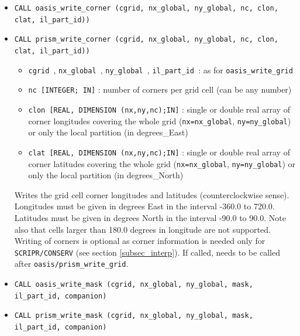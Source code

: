 \begin{itemize}
  Writes the component grid longitudes and latitudes. Longitudes must be
  given in degrees East in the interval -360.0 to 720.0. Latitudes
  must be given in degrees North in the interval -90.0 to 90.0. Note
  that if some grid points overlap, it is recommended to define those
  points with the same number (e.g. 90.0 for both, not 450.0 for one
  and 90.0 for the other) to ensure automatic detection of overlap by
  OASIS3-MCT (which is essential to have a correct conservative
  remapping \texttt{SCRIPR/CONSERV}, see section \ref{subsec_interp}).

  \vspace{0.2cm}
\item {\tt CALL oasis\_write\_corner (cgrid, nx\_global, ny\_global, nc, clon, clat, il\_part\_id))}
\item {\tt CALL prism\_write\_corner (cgrid, nx\_global, ny\_global, nc, clon, clat, il\_part\_id))}

  \begin{itemize}
  \item {\tt cgrid }, {\tt nx\_global }, {\tt ny\_global }, {\tt il\_part\_id }: as for {\tt oasis\_write\_grid}

  \item {\tt nc [INTEGER; IN]} : number of corners per grid cell (can be any number)
  \item {\tt clon [REAL, DIMENSION (nx,ny,nc);IN]} : single or double real array of corner
    longitudes covering the whole grid ({\tt nx=nx\_global}, {\tt ny=ny\_global}) or only the local partition (in degrees\_East)
  \item {\tt clat [REAL, DIMENSION (nx,ny,nc);IN]} : single or double real array of corner
    latitudes covering the whole grid ({\tt nx=nx\_global}, {\tt ny=ny\_global}) or only the local partition (in degrees\_North)
  \end{itemize}

  Writes the grid cell corner longitudes and latitudes
  (counterclockwise sense). Longitudes must be given in degrees East
  in the interval -360.0 to 720.0. Latitudes must be given in degrees
  North in the interval -90.0 to 90.0. Note also that cells larger
  than 180.0 degrees in longitude are not supported. Writing of
  corners is optional as corner information is needed only for {\tt
    SCRIPR/CONSERV} (see section \ref{subsec_interp}). If called,
  needs to be called after {\tt oasis/prism\_write\_grid}.

  \vspace{0.2cm}
\item {\tt CALL oasis\_write\_mask (cgrid, nx\_global, ny\_global, mask, il\_part\_id, companion)}
\item {\tt CALL prism\_write\_mask (cgrid, nx\_global, ny\_global, mask, il\_part\_id, companion)}


\end{itemize}
